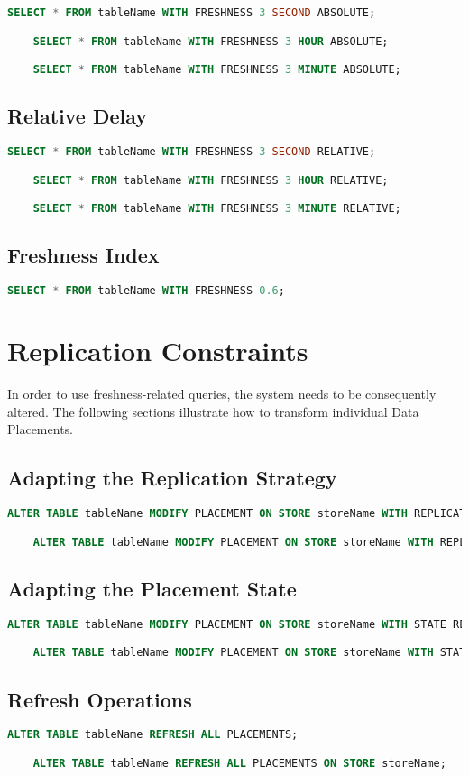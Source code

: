 \begin{lstlisting}[language=sql]
    SELECT * FROM tableName WITH FRESHNESS 3 SECOND ABSOLUTE;

    SELECT * FROM tableName WITH FRESHNESS 3 HOUR ABSOLUTE;

    SELECT * FROM tableName WITH FRESHNESS 3 MINUTE ABSOLUTE;
\end{lstlisting}
\tocless\subsection{Relative Delay}
\begin{lstlisting}[language=sql]
    SELECT * FROM tableName WITH FRESHNESS 3 SECOND RELATIVE;

    SELECT * FROM tableName WITH FRESHNESS 3 HOUR RELATIVE;

    SELECT * FROM tableName WITH FRESHNESS 3 MINUTE RELATIVE;
\end{lstlisting}
\tocless\subsection{Freshness Index}
\begin{lstlisting}[language=sql]
    SELECT * FROM tableName WITH FRESHNESS 0.6;
\end{lstlisting}
\tocless\section{Replication Constraints}
In order to use freshness-related queries, the system needs to be consequently altered.
The following sections illustrate how to transform individual Data Placements.
\tocless\subsection{Adapting the Replication Strategy}
\begin{lstlisting}[language=sql]
    ALTER TABLE tableName MODIFY PLACEMENT ON STORE storeName WITH REPLICATION EAGER;

    ALTER TABLE tableName MODIFY PLACEMENT ON STORE storeName WITH REPLICATION LAZY;
\end{lstlisting}
\tocless\subsection{Adapting the Placement State}
\begin{lstlisting}[language=sql]
    ALTER TABLE tableName MODIFY PLACEMENT ON STORE storeName WITH STATE REFRESHABLE;

    ALTER TABLE tableName MODIFY PLACEMENT ON STORE storeName WITH STATE OUTDATED;
\end{lstlisting}
\tocless\subsection{Refresh Operations}
\begin{lstlisting}[language=sql]
    ALTER TABLE tableName REFRESH ALL PLACEMENTS;

    ALTER TABLE tableName REFRESH ALL PLACEMENTS ON STORE storeName;
\end{lstlisting}
